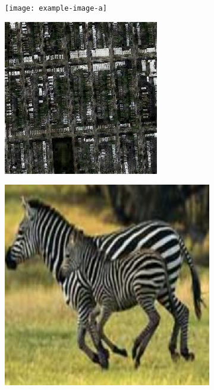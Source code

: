 \begin{figure}
  \medskip

  \begin{subfigure}[t]{.2\textwidth}
    \centering
    \texttt{[image: example-image-a]}
  \end{subfigure}
  \begin{subfigure}[t]{.2\textwidth}
    \centering
    \includegraphics[width=\linewidth]{images/cycleGanResults/Satelite10_Ld120_E100_Lr0002.jpg}
  \end{subfigure}
  \hfill
  \begin{subfigure}[t]{.2\textwidth}
    \centering
    \includegraphics[width=\linewidth]{images/cycleGanResults/zebra_input1.png}

\end{subfigure}
\end{figure}
